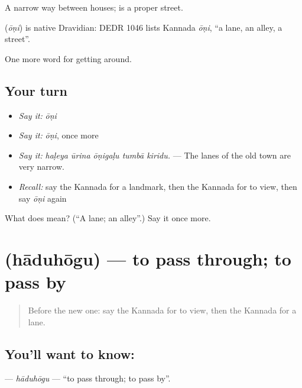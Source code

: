 A narrow way between houses;  is a proper street.

\begin{cousinweb}
\textbf{} (\emph{ōṇi}) is native Dravidian: DEDR 1046 lists Kannada \emph{ōṇi}, \textquotedblleft{}a lane, an alley, a street\textquotedblright{}.
\end{cousinweb}

\begin{grammarlens}[title={What you've built}]
One more word for getting around.
\end{grammarlens}

\subsection*{Your turn}
\begin{itemize}
\raggedright
  \item \emph{Say it:} \emph{ōṇi}
  \item \emph{Say it:} \emph{ōṇi}, once more
  \item \emph{Say it:} \emph{haḷeya ūrina ōṇigaḷu tumbā kiridu.} — The lanes of the old town are very narrow.
  \item \emph{Recall:} say the Kannada for a landmark, then the Kannada for to view, then say \emph{ōṇi} again
\end{itemize}

\begin{tcolorbox}[breakable,colback=teal!4,colframe=teal!35!black,title={Before you move on}]
What does  mean? (\textquotedblleft{}A lane; an alley\textquotedblright{}.) Say it once more.
\end{tcolorbox}
\section[\texorpdfstring{\kn{ಹಾದುಹೋಗು} (hāduhōgu)}{ಹಾದುಹೋಗು (hāduhōgu)}]{ (hāduhōgu) — to pass through; to pass by}

\label{lesson:KA-C457-haduhogu}



\begin{quote}
Before the new one: say the Kannada for to view, then the Kannada for a lane.
\end{quote}

\subsection*{You'll want to know: }
\textbf{} — \emph{hāduhōgu} — \textquotedblleft{}to pass through; to pass by\textquotedblright{}.


